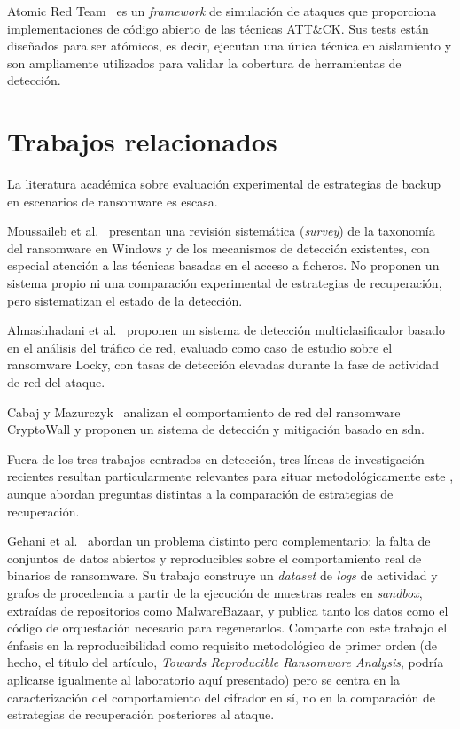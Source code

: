 \documentclass[../main.tex]{subfiles}
\begin{document}
Atomic Red Team~\cite{atomicredteam2024} es un \textit{framework} de
simulación de ataques que proporciona implementaciones de código abierto
de las técnicas ATT\&CK. Sus tests están diseñados para ser atómicos, es
decir, ejecutan una única técnica en aislamiento y son ampliamente
utilizados para validar la cobertura de herramientas de detección.

\section{Trabajos relacionados}

La literatura académica sobre evaluación experimental de estrategias de
backup en escenarios de ransomware es escasa.

Moussaileb et al.~\cite{moussaileb2021} presentan una revisión sistemática
(\emph{survey}) de la taxonomía del ransomware en Windows y de los mecanismos de
detección existentes, con especial atención a las técnicas basadas en el acceso a
ficheros. No proponen un sistema propio ni una comparación experimental de
estrategias de recuperación, pero sistematizan el estado de la detección.

Almashhadani et al.~\cite{almashhadani2019} proponen un sistema de detección
multiclasificador basado en el análisis del tráfico de red, evaluado como caso de
estudio sobre el ransomware Locky, con tasas de detección elevadas durante la fase
de actividad de red del ataque.

Cabaj y Mazurczyk~\cite{cabaj2016} analizan el comportamiento de red del ransomware
CryptoWall y proponen un sistema de detección y mitigación basado en
\gls{sdn}.

Fuera de los tres trabajos centrados en detección, tres líneas de investigación
recientes resultan particularmente relevantes para situar metodológicamente este
\pfg, aunque abordan preguntas distintas a la comparación de estrategias de
recuperación.

Gehani et al.~\cite{gehani2023} abordan un problema distinto pero
complementario: la falta de conjuntos de datos abiertos y reproducibles sobre el
comportamiento real de binarios de ransomware. Su trabajo construye un
\emph{dataset} de \emph{logs} de actividad y grafos de procedencia a partir de la
ejecución de muestras reales en \emph{sandbox}, extraídas de repositorios como
MalwareBazaar, y publica tanto los datos como el código de orquestación necesario
para regenerarlos. Comparte con este trabajo el énfasis en la reproducibilidad
como requisito metodológico de primer orden (de hecho, el título del artículo,
\emph{Towards Reproducible Ransomware Analysis}, podría aplicarse igualmente al
laboratorio aquí presentado) pero se centra en la caracterización del
comportamiento del cifrador en sí, no en la comparación de estrategias de
recuperación posteriores al ataque.
\end{document}
